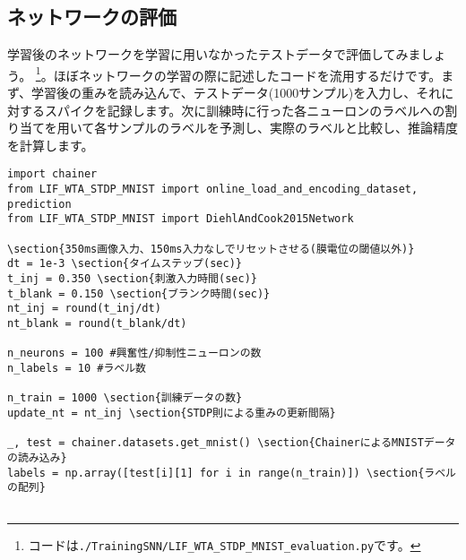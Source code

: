 \subsection{ネットワークの評価}
学習後のネットワークを学習に用いなかったテストデータで評価してみましょう。
\footnote{コードは\texttt{./TrainingSNN/LIF\_WTA\_STDP\_MNIST\_evaluation.py}です。}。ほぼネットワークの学習の際に記述したコードを流用するだけです。まず、学習後の重みを読み込んで、テストデータ(1000サンプル)を入力し、それに対するスパイクを記録します。次に訓練時に行った各ニューロンのラベルへの割り当てを用いて各サンプルのラベルを予測し、実際のラベルと比較し、推論精度を計算します。
\begin{verbatim}
import chainer
from LIF_WTA_STDP_MNIST import online_load_and_encoding_dataset, prediction
from LIF_WTA_STDP_MNIST import DiehlAndCook2015Network

\section{350ms画像入力、150ms入力なしでリセットさせる(膜電位の閾値以外)}
dt = 1e-3 \section{タイムステップ(sec)}
t_inj = 0.350 \section{刺激入力時間(sec)}
t_blank = 0.150 \section{ブランク時間(sec)}
nt_inj = round(t_inj/dt)
nt_blank = round(t_blank/dt)

n_neurons = 100 #興奮性/抑制性ニューロンの数
n_labels = 10 #ラベル数

n_train = 1000 \section{訓練データの数}
update_nt = nt_inj \section{STDP則による重みの更新間隔}

_, test = chainer.datasets.get_mnist() \section{ChainerによるMNISTデータの読み込み}
labels = np.array([test[i][1] for i in range(n_train)]) \section{ラベルの配列}


\end{verbatim}

